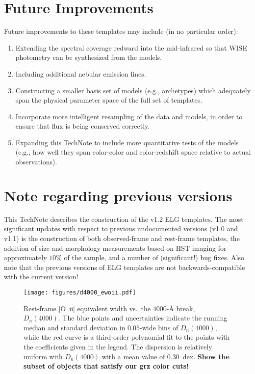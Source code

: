\documentclass[12pt]{article}
\newcommand{\oii}{[O~{\sc ii}]}
\begin{document}
\section{Future Improvements}

Future improvements to these templates may include (in no particular
order): 

\begin{enumerate}
\item{Extending the spectral coverage redward into the mid-infrared so
  that WISE photometry can be synthesized from the models.}
\item{Including additional nebular emission lines.}
\item{Constructing a smaller basis set of models (e.g., archetypes)
  which adequately span the physical parameter space of the full set
  of templates.}
\item{Incorporate more intelligent resampling of the data and models,
  in order to ensure that flux is being conserved correctly.}
\item{Expanding this TechNote to include more quantitative tests of
  the models (e.g., how well they span color-color and color-redshift
  space relative to actual observations).}
\end{enumerate}

\section{Note regarding previous versions}

This TechNote describes the construction of the v1.2 ELG templates.
The most significant updates with respect to previous undocumented
versions (v1.0 and v1.1) is the construction of both observed-frame
and rest-frame templates, the addition of size and morphology
measurements based on HST imaging for approximately $10\%$ of the
sample, and a number of (significant!) bug fixes.  Also note that the
previous versions of ELG templates are not backwards-compatible with
the current version!

\begin{figure}
\centering
\texttt{[image: figures/d4000\_ewoii.pdf]}
\caption{Rest-frame \oii{} equivalent width vs.~the $4000$-\AA{}
  break, $D_{n}(4000)$.  The blue points and uncertainties indicate
  the running median and standard deviation in $0.05$-wide bins of
  $D_{n}(4000)$, while the red curve is a third-order polynomial fit
  to the points with the coefficients given in the
  legend.  The dispersion is relatively uniform with $D_{n}(4000)$
  with a mean value of $0.30$~dex.  {\bf Show the subset of objects
    that satisfy our grz color cuts!}  \label{fig:d4000}}
\end{figure}



%
\end{document}
